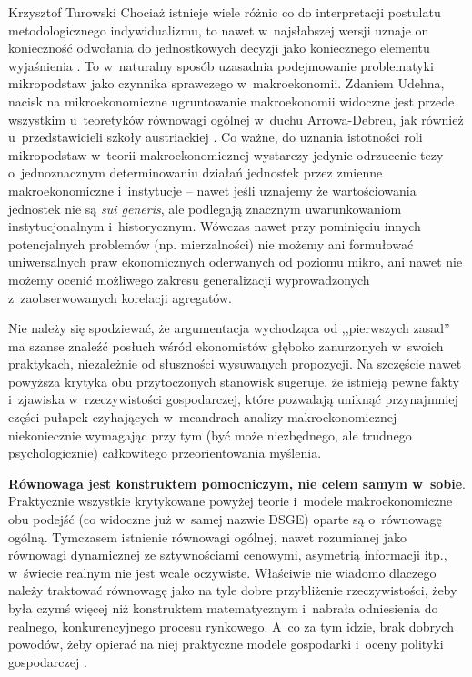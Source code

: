 \begin{artplenv}{Krzysztof Turowski}
Chociaż istnieje wiele różnic co do interpretacji postulatu metodologicznego indywidualizmu, to nawet w~najsłabszej
wersji uznaje on konieczność odwołania do jednostkowych decyzji jako koniecznego elementu wyjaśnienia
\parencite{udehn_methodological_2001}.
To w~naturalny sposób uzasadnia podejmowanie problematyki mikropodstaw jako
czynnika sprawczego w~makroekonomii. Zdaniem Udehna, nacisk na mikroekonomiczne ugruntowanie makroekonomii widoczne
jest przede wszystkim u~teoretyków równowagi ogólnej w~duchu Arrowa-Debreu, jak również u~przedstawicieli szkoły
austriackiej
\parencite{udehn_changing_2002}.
Co ważne, do uznania istotności roli mikropodstaw w~teorii
makroekonomicznej wystarczy jedynie odrzucenie tezy o~jednoznacznym determinowaniu działań jednostek przez zmienne
makroekonomiczne i~instytucje -- nawet jeśli uznajemy że wartościowania jednostek nie są \textit{sui generis}, ale
podlegają znacznym uwarunkowaniom instytucjonalnym i~historycznym. Wówczas nawet przy pominięciu innych potencjalnych
problemów (np. mierzalności) nie możemy ani formułować uniwersalnych praw ekonomicznych oderwanych od poziomu mikro,
ani nawet nie możemy ocenić możliwego zakresu generalizacji wyprowadzonych z~zaobserwowanych korelacji agregatów.

Nie należy się spodziewać, że argumentacja wychodząca od ,,pierwszych zasad'' ma szanse znaleźć posłuch wśród ekonomistów
głęboko zanurzonych w~swoich praktykach, niezależnie od słuszności wysuwanych propozycji. Na szczęście nawet powyższa
krytyka obu przytoczonych stanowisk sugeruje, że istnieją pewne fakty i~zjawiska w~rzeczywistości gospodarczej, które
pozwalają uniknąć przynajmniej części pułapek czyhających w~meandrach analizy makroekonomicznej niekoniecznie wymagając
przy tym (być może niezbędnego, ale trudnego psychologicznie) całkowitego przeorientowania myślenia.

\textbf{Równowaga jest konstruktem pomocniczym, nie celem samym w~sobie}. Praktycznie wszystkie krytykowane powyżej
teorie i~modele makroekonomiczne obu podejść (co widoczne już w~samej nazwie DSGE) oparte są o~równowagę ogólną.
Tymczasem istnienie równowagi ogólnej, nawet rozumianej jako równowagi dynamicznej ze sztywnościami cenowymi, asymetrią
informacji itp., w~świecie realnym nie jest wcale oczywiste. Właściwie nie wiadomo dlaczego należy traktować równowagę
jako na tyle dobre przybliżenie rzeczywistości, żeby była czymś więcej niż konstruktem matematycznym i~nabrała
odniesienia do realnego, konkurencyjnego procesu rynkowego. A~co za tym idzie, brak dobrych powodów, żeby opierać na
niej praktyczne modele gospodarki i~oceny polityki gospodarczej
\parencite{blaug_formalist_2003_tur}.


\end{artplenv}
